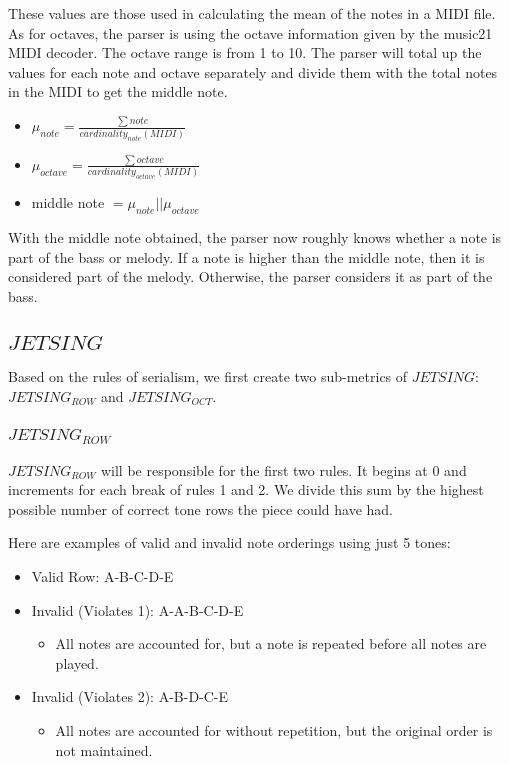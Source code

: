 \documentclass[11pt]{article}
\begin{document}
These values are those used in calculating the mean of the notes in a MIDI file.
As for octaves, the parser is using the octave information given by the music21 MIDI decoder. The octave range is from 1 to 10.
The parser will total up the values for each note and octave separately and divide them with the total notes in the MIDI to get the middle note.

\begin{itemize}
    \item $ \mu_{note} = \frac{\sum note}{cardinality_{note}(MIDI)} $ 
    \item $ \mu_{octave} = \frac{\sum octave}{cardinality_{octave}(MIDI)} $
    \item middle note $= \mu_{note} || \mu_{octave} $
\end{itemize}

With the middle note obtained, the parser now roughly knows whether a note is part of the bass or melody.
If a note is higher than the middle note, then it is considered part of the melody.
Otherwise, the parser considers it as part of the bass.

\subsection{$JETSING$}
Based on the rules of serialism, we first create two sub-metrics of $JETSING$: $JETSING_{ROW}$ and $JETSING_{OCT}$.

\subsubsection{$JETSING_{ROW}$}
$JETSING_{ROW}$ will be responsible for the first two rules.
It begins at 0 and increments for each break of rules 1 and 2. 
We divide this sum by the highest possible number of correct tone rows the piece could have had.

Here are examples of valid and invalid note orderings using just 5 tones:
\begin{itemize}
    \item Valid Row: A-B-C-D-E 
    \item Invalid (Violates 1): A-A-B-C-D-E
    \begin{itemize}
        \item All notes are accounted for, but a note is repeated before all notes are played.
    \end{itemize}
    \item Invalid (Violates 2): A-B-D-C-E
    \begin{itemize}
        \item All notes are accounted for without repetition, but the original order is not maintained.
    \end{itemize}
\end{itemize}
\end{document}
